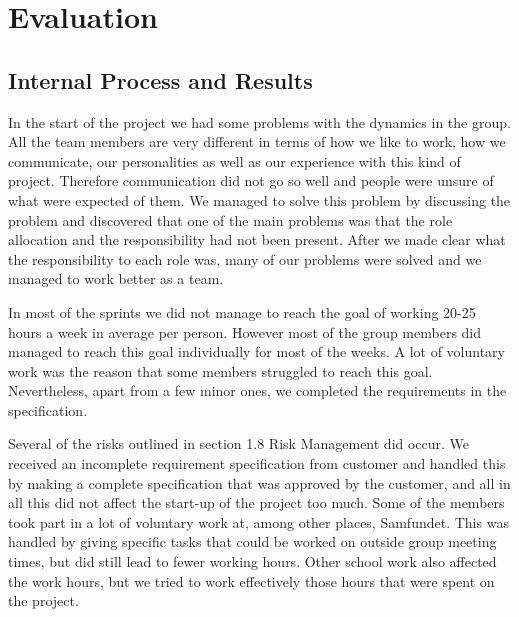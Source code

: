 \section{Evaluation}


\subsection{Internal Process and Results}


	In the start of the project we had some problems with the dynamics in the group. 
	All the team members are very different in terms of how we like to work, how we communicate, 
	our personalities as well as our experience with this kind of project. Therefore communication 
	did not go so well and people were unsure of what were expected of them. We managed to solve 
	this problem by discussing the problem and discovered that one of the main problems was that 
	the role allocation and the responsibility had not been present. After we made clear what the 
	responsibility to each role was, many of our problems were solved and we managed to work better 
	as a team.

	In most of the sprints we did not manage to reach the goal of working 20-25 hours a week in 
	average per person. However most of the group members did managed to reach this goal individually 
	for most of the weeks. A lot of voluntary work was the reason that some members struggled to reach 
	this goal. Nevertheless, apart from a few minor ones, we completed the requirements in the specification.

	Several of the risks outlined in section 1.8 Risk Management did occur. We received an incomplete 
	requirement specification from customer and handled this by making a complete specification that 
	was approved by the customer, and all in all this did not affect the start-up of the project too much. 
	Some of the members took part in a lot of voluntary work at, among other places, Samfundet. This was handled 
	by giving specific tasks that could be worked on outside group meeting times, but did still lead to fewer 
	working hours. Other school work also affected the work hours, but we tried to work effectively those hours 
	that were spent on the project.

